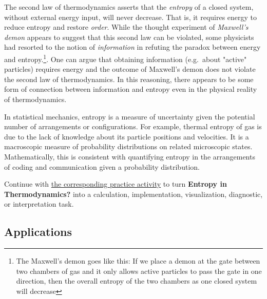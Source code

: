 \documentclass[
  letterpaper,
]{scrbook}
\begin{document}
The second law of thermodynamics asserts that the \emph{entropy} of a
closed system, without external energy input, will never decrease. That
is, it requires energy to reduce entropy and restore \emph{order}. While
the thought experiment of \emph{Maxwell's demon} appears to suggest that
this second law can be violated, some physicists had resorted to the
notion of \emph{information} in refuting the paradox between energy and
entropy.\footnote{The Maxwell's demon goes like this: If we place a
  demon at the gate between two chambers of gas and it only allows
  active particles to pass the gate in one direction, then the overall
  entropy of the two chambers as one closed system will decrease}. One
can argue that obtaining information (e.g.~about "active" particles)
requires energy and the outcome of Maxwell's demon does not violate the
second law of thermodynamics. In this reasoning, there appears to be
some form of connection between information and entropy even in the
physical reality of thermodynamics.

In statistical mechanics, entropy is a measure of uncertainty given the
potential number of arrangements or configurations. For example, thermal
entropy of gas is due to the lack of knowledge about its particle
positions and velocities. It is a macroscopic measure of probability
distributions on related microscopic states. Mathematically, this is
consistent with quantifying entropy in the arrangements of coding and
communication given a probability distribution.

\begin{tcolorbox}[enhanced jigsaw, arc=.35mm, bottomrule=.15mm, bottomtitle=1mm, breakable, colback=white, colbacktitle=quarto-callout-tip-color!10!white, colframe=quarto-callout-tip-color-frame, coltitle=black, left=2mm, leftrule=.75mm, opacityback=0, opacitybacktitle=0.6, rightrule=.15mm, title=\textcolor{quarto-callout-tip-color}{\faLightbulb}\hspace{0.5em}{Put it into practice}, titlerule=0mm, toprule=.15mm, toptitle=1mm]

Continue with \hyperref[sec-pr-05-entropy-in-thermodynamics]{the
corresponding practice activity} to turn \textbf{Entropy in
Thermodynamics?} into a calculation, implementation, visualization,
diagnostic, or interpretation task.

\end{tcolorbox}

\subsection{Applications}\label{applications}
\end{document}
